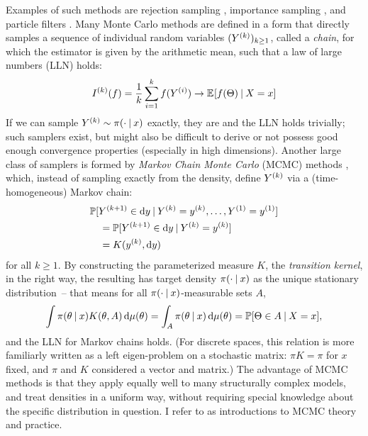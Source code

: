Examples of such methods are rejection sampling \parencites[chapter
II.3]{devroye1986nonuniform}[section 4]{vihola2020lectures}, importance sampling \parencite[section
4]{vihola2020lectures}, and particle filters \parencite{dahlin2015getting}.  Many Monte Carlo
methods are defined in a form that directly samples a sequence of individual random variables
\((Y^{(k)})_{k \ge 1}\), called a \emph{chain}, for which the estimator is given by the arithmetic
mean, such that a law of large numbers (LLN) holds:
\begin{equation}
  \label{eq:mc-lln}
  \kth{I}(f) = \frac{1}{k} \sum_{i=1}^{k} f(\kth[i]{Y}) \to \Exp{f(\Theta) \given X = x}
\end{equation}
If we can sample \(Y^{(k)} \sim \pi(\cdot \:\vert\: x)\) exactly, they are \iid{} and the LLN holds
trivially; such samplers exist, but might also be difficult to derive or not possess good enough
convergence properties (especially in high dimensions).  Another large class of samplers is formed
by \emph{Markov Chain Monte Carlo} (MCMC) methods \parencite{vihola2020lectures,robert1999monte},
which, instead of sampling exactly from the density, define \(Y^{(k)}\) via a (time-homogeneous)
Markov chain:
\begin{equation}
  \label{eq:mc-kernel}
  \begin{aligned}
    &\Prob{\kth[k+1]{Y} \in \dif y
      \given \kth{Y} = \kth{y}, \ldots, \kth[1]{Y} = \kth[1]{y}} \\
    &\quad = \Prob{\kth[k+1]{Y} \in \dif y \given \kth{Y} = \kth{y}}  \\
    &\quad = K(\kth{y}, \dif y) \\
  \end{aligned}
\end{equation}
for all \(k \ge 1\).  By constructing the parameterized measure \(K\), the \emph{transition kernel},
in the right way, the resulting has target density \(\pi(\cdot \:\vert\: x)\) as the unique stationary
distribution~-- that means for all \(\pi(\cdot \:\vert\: x)\)-measurable sets \(A\),
\begin{equation}
  \label{eq:stationarity}
  \int \pi(\theta \given x) K(\theta, A) \dif\mu(\theta) = \int_A \pi(\theta \given x) \dif\mu(\theta) =
  \Prob{\Theta \in A \given X = x},
\end{equation}
and the LLN for Markov chains holds.  (For discrete spaces, this relation is more familiarly written
as a left eigen-problem on a stochastic matrix: \(\pi K = \pi\) for \(x\) fixed, and \(\pi\) and
\(K\) considered a vector and matrix.)  The advantage of MCMC methods is that they apply equally
well to many structurally complex models, and treat densities in a uniform way, without requiring
special knowledge about the specific distribution in question.  I refer to \textcites[chapter
6]{vihola2020lectures}{robert1999monte}[chapters 24 and following]{murphy2012machine} as
introductions to MCMC theory and practice.

